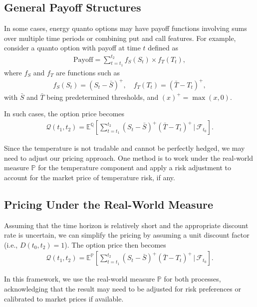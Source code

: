 \documentclass[10pt,a4paper,reqno]{amsart}
\theoremstyle{example}
\begin{document}
\subsection{General Payoff Structures}

In some cases, energy quanto options may have payoff functions involving sums
over multiple time periods or combining put and call features. For example,
consider a quanto option with payoff at time $t$ defined as
\begin{align}
\text{Payoff} = \sum_{t = t_1}^{t_2} f_S(S_t) \times f_T(T_t), \label{eq:sum_payoff}
\end{align}
where $f_S$ and $f_T$ are functions such as
\begin{align}
f_S(S_t) = \left( S_t - \bar{S} \right)^+, \quad f_T(T_t) = \left( \bar{T} - T_t \right)^+,
\end{align}
with $\bar{S}$ and $\bar{T}$ being predetermined thresholds, and $(x)^+ = \max(x, 0)$.

In such cases, the option price becomes
\begin{align}
\mathcal{Q}(t_1, t_2) = \mathbb{E}^{\mathbb{Q}} \left[ \sum_{t = t_1}^{t_2} \left( S_t - \bar{S} \right)^+ \left( \bar{T} - T_t \right)^+ \,\bigg|\, \mathcal{F}_{t_0} \right]. \label{eq:quanto_price_sum}
\end{align}

Since the temperature is not tradable and cannot be perfectly hedged, we may need to adjust our pricing approach. One method is to work under the real-world measure $\mathbb{P}$ for the temperature component and apply a risk adjustment to account for the market price of temperature risk, if any.

\subsection{Pricing Under the Real-World Measure}

Assuming that the time horizon is relatively short and the appropriate discount rate is uncertain, we can simplify the pricing by assuming a unit discount factor (i.e., $D(t_0, t_2) = 1$). The option price then becomes
\begin{align}
\mathcal{Q}(t_1, t_2) = \mathbb{E}^{\mathbb{P}} \left[ \sum_{t = t_1}^{t_2} \left( S_t - \bar{S} \right)^+ \left( \bar{T} - T_t \right)^+ \,\bigg|\, \mathcal{F}_{t_0} \right]. \label{eq:quanto_price_real_world}
\end{align}

In this framework, we use the real-world measure $\mathbb{P}$ for both processes, acknowledging that the result may need to be adjusted for risk preferences or calibrated to market prices if available.
\end{document}
